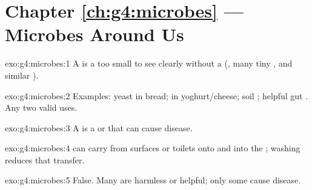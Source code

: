 \section*{Chapter \ref{ch:g4:microbes} --- Microbes Around Us}

\begin{solution}{exo:g4:microbes:1}
A  is a  too small to see clearly without a
 (, many tiny , and similar ).
\end{solution}

\begin{solution}{exo:g4:microbes:2}
Examples: yeast in bread;  in yoghurt/cheese; soil ;
helpful gut . Any two valid uses.
\end{solution}

\begin{solution}{exo:g4:microbes:3}
A  is a  or  that can cause disease.
\end{solution}

\begin{solution}{exo:g4:microbes:4}
 can carry  from surfaces or toilets onto  and into
the ; washing reduces that transfer.
\end{solution}

\begin{solution}{exo:g4:microbes:5}
False. Many  are harmless or helpful; only some cause disease.
\end{solution}

